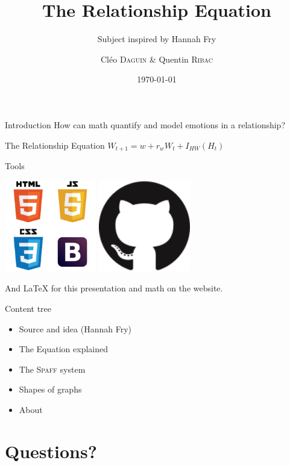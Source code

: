\documentclass[sthlmFooter, 10pt]{beamer}
\title{The Relationship Equation}
\subtitle{Subject inspired by Hannah Fry}
\author{Cléo \textsc{Daguin} \& Quentin \textsc{Ribac}}
\date{\today}
\institute{IUT of Lannion, English class}
\begin{document}
\maketitle

\begin{frame}{Introduction}
\alert{How can math quantify and model emotions in a relationship?}
\begin{block}{The Relationship Equation}
$
W_{t+1} = w + r_w W_t + I_{HW}(H_t)
$
\end{block}
\end{frame}

\begin{frame}{Tools}
\begin{center}
\includegraphics[width=0.3\textwidth]{quad_logos.png}
\includegraphics[width=0.3\textwidth]{github.png}

And \alert{\LaTeX} for this \alert{presentation} and \alert{math} on the website.
\end{center}
\end{frame}

\begin{frame}{Content tree}
\begin{itemize}
\item Source and idea (Hannah Fry)
\item The Equation explained
\item The \textsc{Spaff} system
\item Shapes of graphs
\item About
\end{itemize}
\end{frame}


\section{Questions?}
\end{document}
